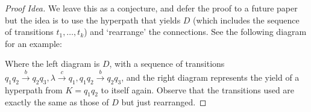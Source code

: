 \documentclass[11pt]{article}
\begin{document}
\begin{proof}[Proof Idea]
  We leave this as a conjecture, and defer the proof to a future paper but the
  idea is to use the hyperpath that yields $D$ (which includes the sequence of
  transitions $t_1,\ldots, t_k$) and `rearrange' the connections. See the
  following diagram for an example:
  \begin{center}
  \end{center}
  Where the left diagram is $D$, with a sequence of transitions $q_1q_2
  \xrightarrow{b} q_2q_3, \lambda \xrightarrow{c} q_1, q_1q_2 \xrightarrow{b}
  q_2q_3$, and the right diagram represents the yield of a hyperpath from $K =
  q_1q_2$ to itself again. Observe that the transitions used are exactly the
  same as those of $D$ but just rearranged. 


\end{proof}
\end{document}
